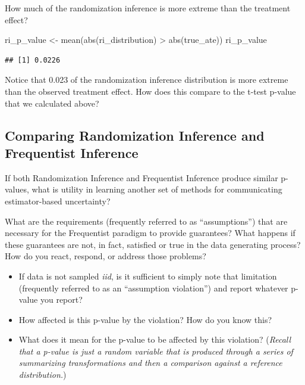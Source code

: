 \documentclass[
]{article}
\newenvironment{Shaded}{\begin{snugshade}}{\end{snugshade}}
\newcommand{\FunctionTok}[1]{\textcolor[rgb]{0.00,0.00,0.00}{#1}}
\newcommand{\NormalTok}[1]{#1}
\newcommand{\OtherTok}[1]{\textcolor[rgb]{0.56,0.35,0.01}{#1}}
\newcommand{\SpecialCharTok}[1]{\textcolor[rgb]{0.00,0.00,0.00}{#1}}
\providecommand{\tightlist}{%
  \setlength{\itemsep}{0pt}\setlength{\parskip}{0pt}}
\begin{document}
How much of the randomization inference is more extreme than the treatment effect?

\begin{Shaded}
\begin{Highlighting}[]
\NormalTok{ri\_p\_value }\OtherTok{\textless{}{-}} \FunctionTok{mean}\NormalTok{(}\FunctionTok{abs}\NormalTok{(ri\_distribution) }\SpecialCharTok{\textgreater{}} \FunctionTok{abs}\NormalTok{(true\_ate))}
\NormalTok{ri\_p\_value}
\end{Highlighting}
\end{Shaded}

\begin{verbatim}
## [1] 0.0226
\end{verbatim}

Notice that 0.023 of the randomization inference distribution is more extreme than the observed treatment effect. How does this compare to the t-test p-value that we calculated above?

\hypertarget{comparing-randomization-inference-and-frequentist-inference}{%
\subsection{Comparing Randomization Inference and Frequentist Inference}\label{comparing-randomization-inference-and-frequentist-inference}}

If both Randomization Inference and Frequentist Inference produce similar p-values, what is utility in learning another set of methods for communicating estimator-based uncertainty?

What are the requirements (frequently referred to as ``assumptions'') that are necessary for the Frequentist paradigm to provide guarantees? What happens if these guarantees are not, in fact, satisfied or true in the data generating process? How do you react, respond, or address those problems?

\begin{itemize}
\tightlist
\item
  If data is not sampled \emph{iid}, is it sufficient to simply note that limitation (frequently referred to as an ``assumption violation'') and report whatever p-value you report?
\item
  How affected is this p-value by the violation? How do you know this?
\item
  What does it mean for the p-value to be affected by this violation? (\emph{Recall that a p-value is just a random variable that is produced through a series of summarizing transformations and then a comparison against a reference distribution.})
\end{itemize}
\end{document}
